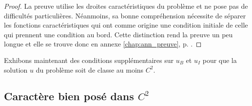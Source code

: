 \begin{proof}
La preuve utilise les droites caractéristiques du problème et ne pose pas de difficultés particulières. 
Néanmoins, sa bonne compréhension nécessite de séparer les fonctions caractéristiques qui ont comme origine une condition initiale de celle qui prennent une condition au bord. 
Cette distinction rend la preuve un peu longue et elle se trouve donc en annexe \ref{chap:ann_preuve}, p. \pageref{chap:ann_preuve}. 
\end{proof}

Exhibons maintenant des conditions supplémentaires sur $u_B$ et $u_I$ pour que la solution $u$ du problème soit de classe au moins $C^2$. 

\subsection{Caractère bien posé dans $C^2$} \label{subsec:carac_C2_gen}

